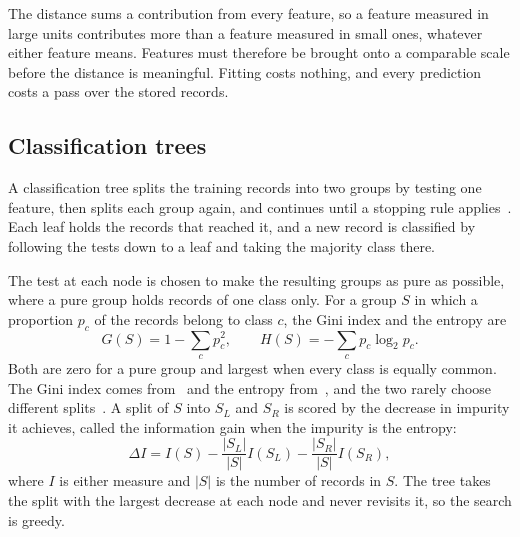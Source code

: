 \documentclass[conference,10pt]{IEEEtran}
\begin{document}
The distance sums a contribution from every feature, so a feature measured
in large units contributes more than a feature measured in small ones,
whatever either feature means. Features must therefore be brought onto a
comparable scale before the distance is meaningful. Fitting costs nothing, and every prediction costs a pass over the stored
records.

\subsection{Classification trees}
\label{subsec:bg_tree}

A classification tree splits the training records into two groups by testing
one feature, then splits each group again, and continues until a stopping
rule applies~\cite{breiman1984cart}. Each leaf holds the records that
reached it, and a new record is classified by following the tests down to a
leaf and taking the majority class there.

The test at each node is chosen to make the resulting groups as pure as
possible, where a pure group holds records of one class only. For a group
$S$ in which a proportion $p_c$ of the records belong to class $c$, the Gini
index and the entropy are
\begin{equation}
  G(S) = 1 - \sum_{c} p_c^2, \qquad
  H(S) = -\sum_{c} p_c \log_2 p_c .
\end{equation}
Both are zero for a pure group and largest when every class is equally
common. The Gini index comes from~\cite{breiman1984cart} and the entropy
from~\cite{quinlan1986induction}, and the two rarely choose different
splits~\cite{raileanu2004theoretical}. A split of $S$ into $S_L$ and $S_R$
is scored by the decrease in impurity it achieves, called the information
gain when the impurity is the entropy:
\begin{equation}
  \Delta I = I(S) - \frac{|S_L|}{|S|} I(S_L) - \frac{|S_R|}{|S|} I(S_R),
\end{equation}
where $I$ is either measure and $|S|$ is the number of records in $S$. The
tree takes the split with the largest decrease at each node and never
revisits it, so the search is greedy. 
\end{document}

